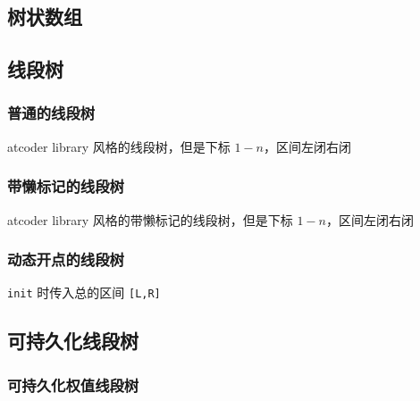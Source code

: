 \documentclass[12pt]{article}
\theoremstyle{definition}
\theoremstyle{remark}
\begin{document}
\subsection{树状数组}



\newpage

\subsection{线段树}

\subsubsection{普通的线段树}

atcoder library 风格的线段树，但是下标 $1-n$，区间左闭右闭



\newpage

\subsubsection{带懒标记的线段树}

atcoder library 风格的带懒标记的线段树，但是下标 $1-n$，区间左闭右闭



\newpage

\subsubsection{动态开点的线段树}

\texttt{init} 时传入总的区间 \texttt{[L,R]}



\newpage

\subsection{可持久化线段树}

\subsubsection{可持久化权值线段树}


\end{document}
